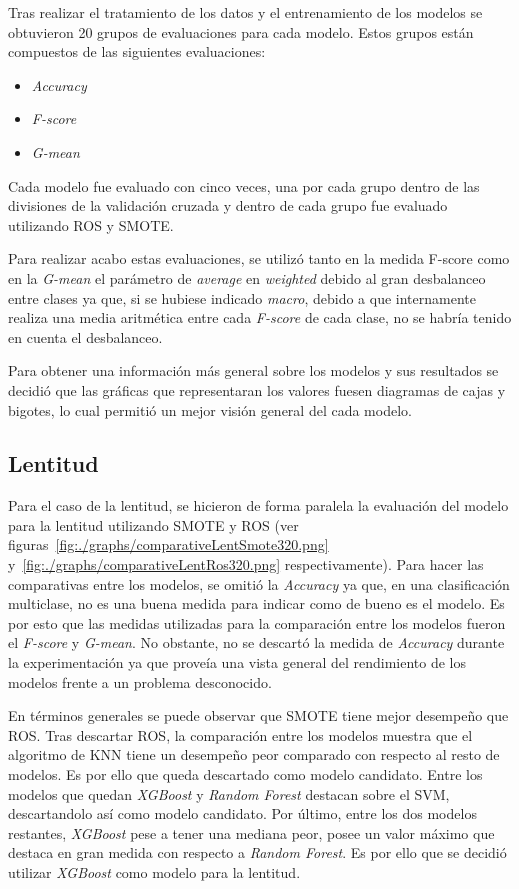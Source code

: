 Tras realizar el tratamiento de los datos y el entrenamiento de los modelos se obtuvieron 20 grupos de evaluaciones para cada modelo. Estos grupos están compuestos de las siguientes evaluaciones:
\begin{itemize}
\item \textit{Accuracy}
\item \textit{F-score}
\item \textit{G-mean}
\end{itemize}
Cada modelo fue evaluado con cinco veces, una por cada grupo dentro de las divisiones de la validación cruzada y dentro de cada grupo fue evaluado utilizando ROS y SMOTE.

Para realizar acabo estas evaluaciones, se utilizó tanto en la medida F-score como en la \textit{G-mean} el parámetro de \textit{average} en \textit{weighted} debido al gran desbalanceo entre clases ya que, si se hubiese indicado \textit{macro}, debido a que internamente realiza una media aritmética entre cada \textit{F-score} de cada clase, no se habría tenido en cuenta el desbalanceo.

Para obtener una información más general sobre los modelos y sus resultados se decidió que las gráficas que representaran los valores fuesen diagramas de cajas y bigotes, lo cual permitió un mejor visión general del cada modelo.

\subsection{Lentitud}
Para el caso de la lentitud, se hicieron de forma paralela la evaluación del modelo para la lentitud utilizando SMOTE y ROS (ver figuras~\ref{fig:./graphs/comparativeLentSmote320.png} y~\ref{fig:./graphs/comparativeLentRos320.png} respectivamente).
Para hacer las comparativas entre los modelos, se omitió la \textit{Accuracy} ya que, en una clasificación multiclase, no es una buena medida para indicar como de bueno es el modelo. Es por esto que las medidas utilizadas para la comparación entre los modelos fueron el \textit{F-score} y \textit{G-mean}. No obstante, no se descartó la medida de \textit{Accuracy} durante la experimentación ya que proveía una vista general del rendimiento de los modelos frente a un problema desconocido.

En términos generales se puede observar que SMOTE tiene mejor desempeño que ROS. Tras descartar ROS, la comparación entre los modelos muestra que el algoritmo de KNN tiene un desempeño peor comparado con respecto al resto de modelos. Es por ello que queda descartado como modelo candidato. Entre los modelos que quedan \textit{XGBoost} y \textit{Random Forest} destacan sobre el SVM, descartandolo así como modelo candidato. Por último, entre los dos modelos restantes, \textit{XGBoost} pese a tener una mediana peor, posee un valor máximo que destaca en gran medida con respecto a \textit{Random Forest}. Es por ello que se decidió utilizar \textit{XGBoost} como modelo para la lentitud.

